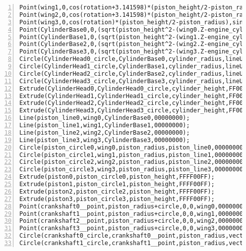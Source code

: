 \begin{lstlisting}[numbers=left]
Point(wing1,0,cos(rotation+3.141598)*(piston_height/2-piston_radius),sin(rotation+3.141598)*(piston_height/2-piston_radius),engine_cylinder1,000000FF);
Point(wing2,0,cos(rotation+3.141598)*(piston_height/2-piston_radius),sin(rotation+3.141598)*(piston_height/2-piston_radius),engine_cylinder2,000000FF);
Point(wing3,0,cos(rotation)*(piston_height/2-piston_radius),sin(rotation)*(piston_height/2-piston_radius),engine_cylinder3,000000FF);
Point(CylinderBase0,0,(sqrt(piston_height^2-(wing0.Z-engine_cylinder0.Z)^2))+wing0.Y-engine_cylinder0.Y,0,engine_cylinder0,00FF00FF);
Point(CylinderBase1,0,(sqrt(piston_height^2-(wing1.Z-engine_cylinder1.Z)^2))+wing1.Y-engine_cylinder1.Y,0,engine_cylinder1,00FF00FF);
Point(CylinderBase2,0,(sqrt(piston_height^2-(wing2.Z-engine_cylinder2.Z)^2))+wing2.Y-engine_cylinder2.Y,0,engine_cylinder2,00FF00FF);
Point(CylinderBase3,0,(sqrt(piston_height^2-(wing3.Z-engine_cylinder3.Z)^2))+wing3.Y-engine_cylinder3.Y,0,engine_cylinder3,00FF00FF);
Circle(CylinderHead0_circle,CylinderBase0,cylinder_radius,lineUP,00000000);
Circle(CylinderHead1_circle,CylinderBase1,cylinder_radius,lineUP,00000000);
Circle(CylinderHead2_circle,CylinderBase2,cylinder_radius,lineUP,00000000);
Circle(CylinderHead3_circle,CylinderBase3,cylinder_radius,lineUP,00000000);
Extrude(CylinderHead0,CylinderHead0_circle,cylinder_height,FF00FFFF);
Extrude(CylinderHead1,CylinderHead1_circle,cylinder_height,FF00FFFF);
Extrude(CylinderHead2,CylinderHead2_circle,cylinder_height,FF00FFFF);
Extrude(CylinderHead3,CylinderHead3_circle,cylinder_height,FF00FFFF);
Line(piston_line0,wing0,CylinderBase0,00000000);
Line(piston_line1,wing1,CylinderBase1,00000000);
Line(piston_line2,wing2,CylinderBase2,00000000);
Line(piston_line3,wing3,CylinderBase3,00000000);
Circle(piston_circle0,wing0,piston_radius,piston_line0,00000000);
Circle(piston_circle1,wing1,piston_radius,piston_line1,00000000);
Circle(piston_circle2,wing2,piston_radius,piston_line2,00000000);
Circle(piston_circle3,wing3,piston_radius,piston_line3,00000000);
Extrude(piston0,piston_circle0,piston_height,FFFF00FF);
Extrude(piston1,piston_circle1,piston_height,FFFF00FF);
Extrude(piston2,piston_circle2,piston_height,FFFF00FF);
Extrude(piston3,piston_circle3,piston_height,FFFF00FF);
Point(crankshaft0__point,piston_radius+circle,0,0,wing0,00000000);
Point(crankshaft1__point,piston_radius+circle,0,0,wing1,00000000);
Point(crankshaft2__point,piston_radius+circle,0,0,wing2,00000000);
Point(crankshaft3__point,piston_radius+circle,0,0,wing3,00000000);
Circle(crankshaft0_circle,crankshaft0__point,piston_radius,vectorLeft,0000FF00);
Circle(crankshaft1_circle,crankshaft1__point,piston_radius,vectorLeft,0000FF00);

\end{lstlisting}
